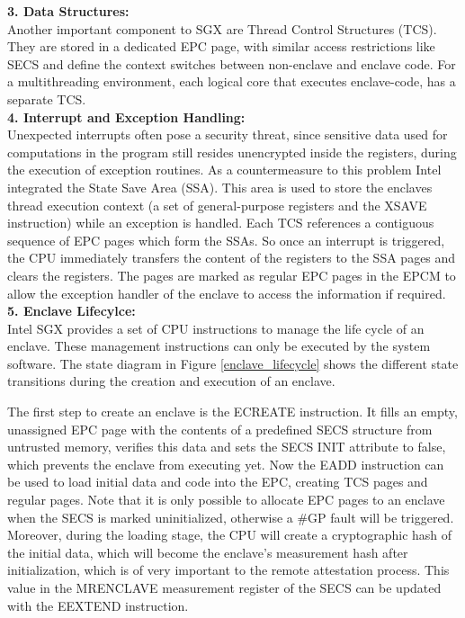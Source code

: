 \textbf{3. Data Structures:}\\


Another important component to SGX are Thread Control Structures (TCS). They are stored in a dedicated EPC page, with similar access restrictions like SECS and define the context switches between non-enclave and enclave code. For a multithreading environment, each logical core that executes enclave-code, has a separate TCS. \\

\textbf{4. Interrupt and Exception Handling:}\\
Unexpected interrupts often pose a security threat, since sensitive data used for computations in the program still resides unencrypted inside the registers, during the execution of exception routines. 
As a countermeasure to this problem Intel integrated the State Save Area (SSA). This area is used to store the enclaves thread execution context (a set of general-purpose registers and the XSAVE instruction) while an exception is handled. Each TCS references a contiguous sequence of EPC pages which form the SSAs. So once an interrupt is triggered, the CPU immediately transfers the content of the registers to the SSA pages and clears the registers. The pages are marked as regular EPC pages in the EPCM to allow the exception handler of the enclave to access the information if required. \cite{sgx_101}  \\

\textbf{5. Enclave Lifecylce:}\\
Intel SGX provides a set of CPU instructions to manage the life cycle of an enclave. These management instructions can only be executed by the system software. The state diagram in Figure \ref{enclave_lifecycle} shows the different state transitions during the creation and execution of an enclave. 

The first step to create an enclave is the ECREATE instruction. It fills an empty, unassigned EPC page with the contents of a predefined SECS structure from untrusted memory, verifies this data and sets the SECS INIT attribute to false, which prevents the enclave from executing yet. Now the EADD instruction can be used to load initial data and code into the EPC, creating TCS pages and regular pages. Note that it is only possible to allocate EPC pages to an enclave when the SECS is marked uninitialized, otherwise a \#GP fault will be triggered. Moreover, during the loading stage, the CPU will create a cryptographic hash of the initial data, which will become the enclave’s measurement hash after initialization, which is of very important to the remote attestation process. This value in the MRENCLAVE measurement register of the SECS can be updated with the EEXTEND instruction. 

